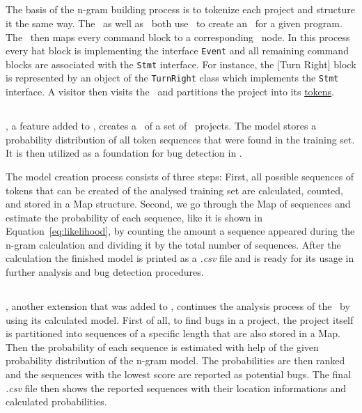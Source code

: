 \subsection{\tokenizer{}}\label{subsec:tokenizer}
The basis of the n-gram building process is to tokenize each project and structure it the same way. The \ngramtrainer\ as well as \ngrambugfinder\ both use \litterbox\ to create an \AST\ for a given program. The \AST\ then maps every command block to a corresponding \AST\ node. In this process every hat block is implementing the interface \texttt{Event} and all remaining command blocks are associated with the \texttt{Stmt} interface. For instance, the [Turn Right] block is represented by an object of the \texttt{TurnRight} class which implements the \texttt{Stmt} interface. A visitor then visits the \AST\ and partitions the project into its \hyperref[def:token]{tokens}.

\subsection{\ngramtrainer{}}\label{subsec:ngramtrainer}
\ngramtrainer, a feature added to \litterbox, creates a \ngram\ of a set of \scratch\ projects. The model stores a probability distribution of all token sequences that were found in the training set. It is then utilized as a foundation for bug detection in \scratch.

The model creation process consists of three steps: First, all possible sequences of tokens that can be created of the analysed training set are calculated, counted, and stored in a Map structure. Second, we go through the Map of sequences and estimate the probability of each sequence, like it is shown in Equation~\ref{eq:likelihood}, by counting the amount a sequence appeared during the n-gram calculation and dividing it by the total number of sequences. After the calculation the finished model is printed as a \textit{.csv} file and is ready for its usage in further analysis and bug detection procedures.

\subsection{\ngrambugfinder{}}\label{subsec:ngrambugfinder}
\ngrambugfinder, another extension that was added to \litterbox, continues the analysis process of the \ngramtrainer\ by using its calculated model. First of all, to find bugs in a project, the project itself is partitioned into sequences of a specific length that are also stored in a Map. Then the probability of each sequence is estimated with help of the given probability distribution of the n-gram model. The probabilities are then ranked and the sequences with the lowest score are reported as potential bugs. The final \textit{.csv} file then shows the reported sequences with their location informations and calculated probabilities.